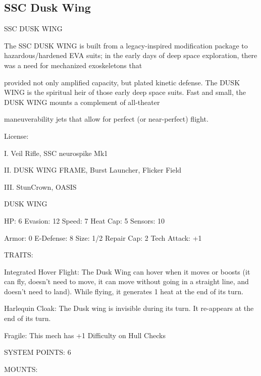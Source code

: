 \subsection{SSC Dusk Wing}

                                           SSC DUSK WING  

The SSC DUSK WING is built from a legacy-inspired modification package to hazardous/hardened EVA  
suits; in the early days of deep space exploration, there was a need for mechanized exoskeletons that  

provided not only amplified capacity, but plated kinetic defense. The DUSK WING is the spiritual heir of  
those early deep space suits. Fast and small, the DUSK WING mounts a complement of all-theater  

maneuverability jets that allow for perfect (or near-perfect) flight.    

                                                    License:
 
I. Veil Rifle, SSC neurospike Mk1
 
II. DUSK WING FRAME, Burst Launcher, Flicker Field
 
III. StunCrown, OASIS
 

                                                 DUSK WING 

  HP: 6           Evasion: 12                           Speed: 7            Heat Cap: 5        Sensors: 10 

  Armor: 0        E-Defense: 8                          Size: 1/2           Repair Cap: 2      Tech Attack:  
                                                                                               +1 

                                                     TRAITS: 

  Integrated Hover Flight: The Dusk Wing can hover when it moves or boosts (it can fly, doesn’t need to  
  move, it can move without going in a straight line, and doesn’t need to land). While flying, it generates 1  
  heat at the end of its turn.
 
  Harlequin Cloak: The Dusk wing is invisible during its turn. It re-appears at the end of its turn.
 
  Fragile: This mech has +1 Difficulty on Hull Checks 

                                              SYSTEM POINTS: 6 

                                                    MOUNTS: 

